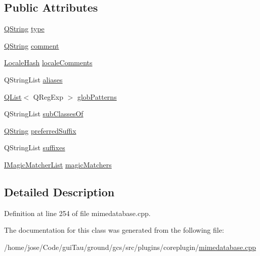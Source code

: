 \subsection*{Public Attributes}
\begin{DoxyCompactItemize}
\item 
\hyperlink{group___u_a_v_objects_plugin_gab9d252f49c333c94a72f97ce3105a32d}{Q\-String} \hyperlink{group___core_plugin_ga7dbb8f6515ba35d7085128e34d73780e}{type}
\item 
\hyperlink{group___u_a_v_objects_plugin_gab9d252f49c333c94a72f97ce3105a32d}{Q\-String} \hyperlink{group___core_plugin_ga251b5ca21fe2345ccbc33cf8ee61497f}{comment}
\item 
\hyperlink{group___core_plugin_gabaf932c31842b2da7fc0e9821b5411dd}{Locale\-Hash} \hyperlink{group___core_plugin_gada0e5093133c4b18896aba408f438e01}{locale\-Comments}
\item 
Q\-String\-List \hyperlink{group___core_plugin_ga496a24d7c95aca273872b4731ad4979e}{aliases}
\item 
\hyperlink{class_q_list}{Q\-List}$<$ Q\-Reg\-Exp $>$ \hyperlink{group___core_plugin_ga04e9a24f7770cb063fcd46fa119e74e6}{glob\-Patterns}
\item 
Q\-String\-List \hyperlink{group___core_plugin_ga708168392cf9284c5b2a3732164c46bd}{sub\-Classes\-Of}
\item 
\hyperlink{group___u_a_v_objects_plugin_gab9d252f49c333c94a72f97ce3105a32d}{Q\-String} \hyperlink{group___core_plugin_gaafa45c85eece3a688d455cb2307626e7}{preferred\-Suffix}
\item 
Q\-String\-List \hyperlink{group___core_plugin_ga90349fbad7bef53d58473cb727d1eaee}{suffixes}
\item 
\hyperlink{group___core_plugin_ga01712cfcc6b7a1dd9c6a1163064fc3d6}{I\-Magic\-Matcher\-List} \hyperlink{group___core_plugin_ga36c49a606b4d45c846cf1d188f00432f}{magic\-Matchers}
\end{DoxyCompactItemize}


\subsection{Detailed Description}


Definition at line 254 of file mimedatabase.\-cpp.



The documentation for this class was generated from the following file\-:\begin{DoxyCompactItemize}
\item 
/home/jose/\-Code/gui\-Tau/ground/gcs/src/plugins/coreplugin/\hyperlink{mimedatabase_8cpp}{mimedatabase.\-cpp}\end{DoxyCompactItemize}
